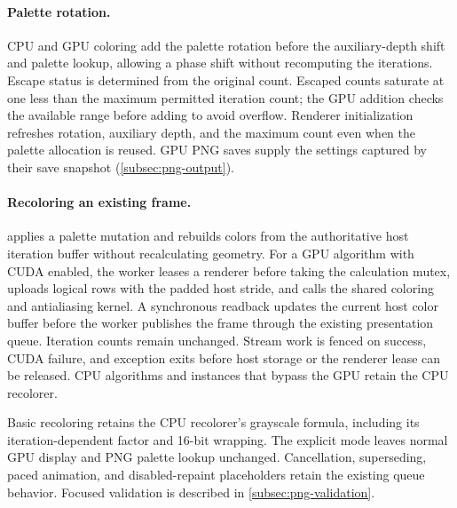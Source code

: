 \paragraph{Palette rotation.}
CPU and GPU coloring add the palette rotation before the auxiliary-depth
shift and palette lookup, allowing a phase shift without recomputing the
iterations. Escape status is determined from the original count. Escaped
counts saturate at one less than the maximum permitted iteration count;
the GPU addition checks the available range before adding to avoid overflow.
Renderer initialization refreshes rotation, auxiliary depth, and the maximum
count even when the palette allocation is reused. GPU PNG saves supply the
settings captured by their save snapshot (\cref{subsec:png-output}).

\paragraph{Recoloring an existing frame.}
 applies a palette mutation and rebuilds colors
from the authoritative host iteration buffer without recalculating geometry.
For a GPU algorithm with CUDA enabled, the worker leases a renderer before
taking the calculation mutex, uploads logical rows with the padded host
stride, and calls the shared coloring and antialiasing kernel. A synchronous
readback updates the current host color buffer before the worker publishes
the frame through the existing presentation queue. Iteration counts remain
unchanged. Stream work is fenced on success, CUDA failure, and exception exits
before host storage or the renderer lease can be released. CPU algorithms and
instances that bypass the GPU retain the CPU recolorer.

Basic recoloring retains the CPU recolorer's grayscale formula, including
its iteration-dependent factor and 16-bit wrapping. The explicit mode leaves
normal GPU display and PNG palette lookup unchanged. Cancellation, superseding,
paced animation, and disabled-repaint placeholders retain the existing queue
behavior. Focused validation is described in \cref{subsec:png-validation}.

